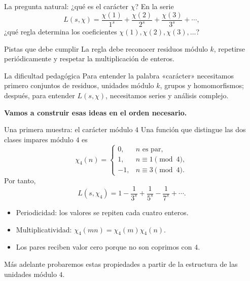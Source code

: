 \documentclass[aspectratio=169,11pt]{beamer}
\begin{document}
\begin{frame}{La pregunta natural: ¿qué es el carácter $\chi$?}
    En la serie
    \[
      L(s,\chi)=\frac{\chi(1)}{1^s}+\frac{\chi(2)}{2^s}+\frac{\chi(3)}{3^s}+\cdots,
    \]
    ¿qué regla determina los coeficientes $\chi(1),\chi(2),\chi(3),\ldots$?
    \begin{exampleblock}{Pistas que debe cumplir}
        La regla debe reconocer residuos módulo $k$, repetirse periódicamente y respetar la multiplicación de enteros.
    \end{exampleblock}
    \begin{alertblock}{La dificultad pedagógica}
        Para entender la palabra «carácter» necesitamos primero conjuntos de residuos, unidades módulo $k$, grupos y homomorfismos; después, para entender $L(s,\chi)$, necesitamos series y análisis complejo.
    \end{alertblock}
    \centering\color{UdeAGreen}\bfseries Vamos a construir esas ideas en el orden necesario.
\end{frame}

\begin{frame}{Una primera muestra: el carácter módulo $4$}
    Una función que distingue las dos clases impares módulo $4$ es
    \[
      \chi_4(n)=
      \begin{cases}
        0,&n\text{ es par},\\
        1,&n\equiv1\pmod4,\\
        -1,&n\equiv3\pmod4.
      \end{cases}
    \]
    Por tanto,
    \[
      L(s,\chi_4)=1-\frac{1}{3^s}+\frac{1}{5^s}-\frac{1}{7^s}+\cdots.
    \]
    \begin{itemize}
        \item Periodicidad: los valores se repiten cada cuatro enteros.
        \item Multiplicatividad: $\chi_4(mn)=\chi_4(m)\chi_4(n)$.
        \item Los pares reciben valor cero porque no son coprimos con $4$.
    \end{itemize}
    \centering\small Más adelante probaremos estas propiedades a partir de la estructura de las unidades módulo $4$.
\end{frame}
\end{document}
